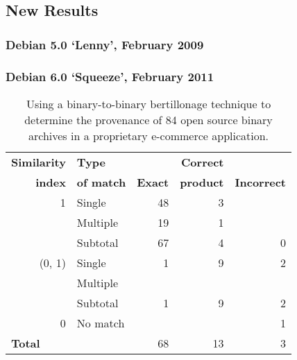 \subsection{New Results}

\subsubsection{Debian 5.0 `Lenny', February 2009}

\subsubsection{Debian 6.0 `Squeeze', February 2011}


\begin{table}[htbp]
  \centering
  \begin{tabular}{rlrrr}
\textbf{\small{Similarity}} & \textbf{\small{Type}}     &                        & \textbf{\small{Correct}} &                            \\
\textbf{\small{index}}      & \textbf{\small{of match}} & \textbf{\small{Exact}} & \textbf{\small{product}} & \textbf{\small{Incorrect}} \\
\hline\hline

                                        1  & Single    & 48 & 3   &       \\
                                           & Multiple  & 19 & 1   &       \\
\cline{2-5}
                                           & Subtotal  & 67 & 4   & 0     \\
\hline

                                    (0, 1) & Single    &  1 & 9   & 2     \\
                                           & Multiple  &    &     &       \\
\cline{2-5}
                                           & Subtotal  &  1 & 9   & 2     \\
\hline

                                        0  & No match  &    &     & 1     \\ [3 pt]
\multicolumn{1}{l}{\textbf{\small{Total}}} &           & 68 & 13  & 3     \\
\hline
  \end{tabular}
  \vspace{1mm}
  \caption{Using a binary-to-binary bertillonage technique to determine the provenance of 84 open source binary archives in a proprietary e-commerce application.}
  \label{tab:binToBin}
\end{table}

